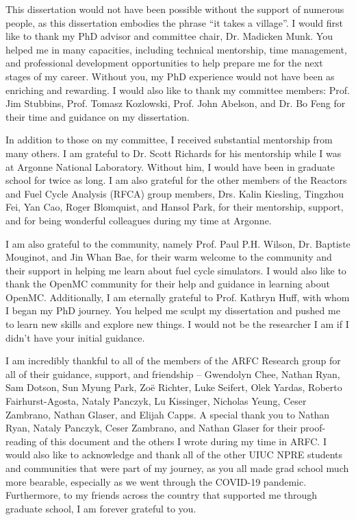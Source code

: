 This dissertation would not have been possible without the support 
of numerous people, as this dissertation embodies the phrase 
``it takes a village''. I would first like to thank my PhD advisor and 
committee chair, Dr. 
Madicken Munk. You helped me in many capacities, including technical 
mentorship, time management, and professional development opportunities 
to help prepare me for the next stages of my career. Without you, my PhD 
experience would not have been as enriching and rewarding. I would also like 
to thank my committee members: Prof. Jim Stubbins, Prof. Tomasz Kozlowski, 
Prof. John Abelson, and Dr. Bo Feng for their time and guidance on my dissertation. 

In addition to those on my committee, I received substantial mentorship from 
many others. I am grateful to Dr. Scott Richards for his mentorship while I 
was at Argonne National Laboratory. Without him, I would have been in graduate school 
for twice as long. I am also grateful for the other members of the 
Reactors and Fuel Cycle Analysis (RFCA) group members, Drs. Kalin
Kiesling, Tingzhou Fei, Yan Cao, Roger Blomquist, and Hansol Park, 
for their mentorship, support, and for being wonderful colleagues during my 
time at Argonne. 

I am also grateful to the \Cyclus community, namely Prof. 
Paul P.H. Wilson, Dr. Baptiste Mouginot, and Jin Whan Bae, for their warm 
welcome to the \Cyclus community and their support in helping me learn about 
fuel cycle simulators. I would also like to thank the OpenMC community 
for their help and guidance in learning about OpenMC. 
Additionally, I am eternally grateful to Prof. 
Kathryn Huff, with whom I began my PhD journey. You helped me sculpt my 
dissertation and pushed me to learn new skills and explore new things. 
I would not be the researcher I am if I didn't have your initial 
guidance. 

I am incredibly thankful to all of the members of the \gls{ARFC} Research 
group for all of their guidance, support, and friendship -- Gwendolyn 
Chee, 
Nathan Ryan, Sam Dotson, Sun Myung Park, Zo\"{e} Richter, Luke Seifert, 
Olek Yardas, Roberto Fairhurst-Agosta, Nataly Panczyk, Lu Kissinger, 
Nicholas Yeung, Ceser Zambrano, Nathan Glaser, and Elijah Capps. 
A special thank you to Nathan Ryan, Nataly Panczyk, Ceser Zambrano, 
and Nathan Glaser for their proof-reading of this document and the 
others I wrote during my 
time in \gls{ARFC}. I would also like to acknowledge and thank all of the other 
UIUC NPRE students and communities that were part of my journey, as 
you all made grad school much more bearable, especially as we went through 
the COVID-19 pandemic. Furthermore, to my friends across the country that 
supported me through graduate school, I am forever grateful to you. 

